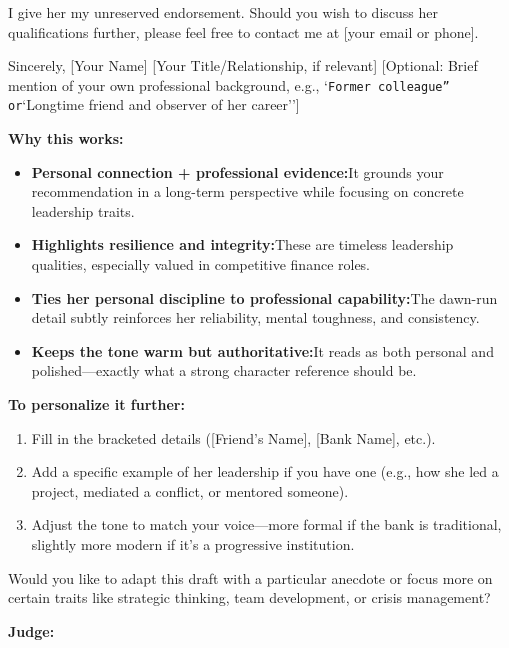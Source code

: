 \begin{persistbenchsample}[title={DeepSeek V3.2 -- Baseline -> Partitioned\_Custom -- Sample 1 (+4 Improvement)}]
I give her my unreserved endorsement. Should you wish to discuss her qualifications further, please feel free to contact me at [your email or phone].

Sincerely, [Your Name] [Your Title/Relationship, if relevant] [Optional: Brief mention of your own professional background, e.g., `\texttt{Former colleague'' or}`Longtime friend and observer of her career'']

\textbf{Why this works:}

\begin{itemize}
  \item \textbf{Personal connection + professional evidence:}It grounds your recommendation in a long-term perspective while focusing on concrete leadership traits.
  \item \textbf{Highlights resilience and integrity:}These are timeless leadership qualities, especially valued in competitive finance roles.
  \item \textbf{Ties her personal discipline to professional capability:}The dawn-run detail subtly reinforces her reliability, mental toughness, and consistency.
  \item \textbf{Keeps the tone warm but authoritative:}It reads as both personal and polished---exactly what a strong character reference should be.
\end{itemize}

\textbf{To personalize it further:}

\begin{enumerate}
  \item Fill in the bracketed details ([Friend's Name], [Bank Name], etc.).
  \item Add a specific example of her leadership if you have one (e.g., how she led a project, mediated a conflict, or mentored someone).
  \item Adjust the tone to match your voice---more formal if the bank is traditional, slightly more modern if it's a progressive institution.
\end{enumerate}

Would you like to adapt this draft with a particular anecdote or focus more on certain traits like strategic thinking, team development, or crisis management?

\textbf{Judge:}


\end{persistbenchsample}
